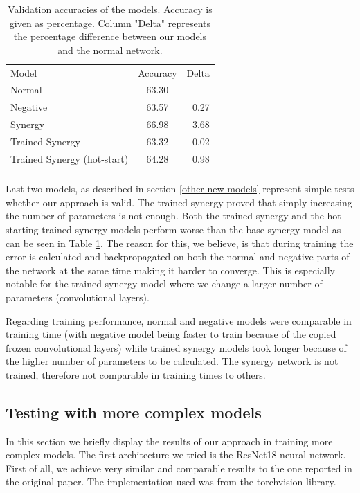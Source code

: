 \documentclass[b5paper]{book}
\let\cite\parencite
\begin{document}
\begin{table}
\centering
\caption{Validation accuracies of the models. Accuracy is given as percentage. Column "Delta" represents the percentage difference between our models and the normal network.}
\label{tab:6}
\begin{tabular}{lcr}
\hline\noalign{\smallskip}
Model & Accuracy & Delta\\
\noalign{\smallskip}\hline\noalign{\smallskip}
Normal & 63.30 & - \\
Negative & 63.57 & 0.27 \\
Synergy & 66.98 & 3.68 \\
Trained Synergy & 63.32 & 0.02 \\
Trained Synergy (hot-start) & 64.28 & 0.98 \\
\noalign{\smallskip}\hline
\end{tabular}
\end{table}

Last two models, as described in section \ref{other new models} represent simple tests whether our approach is valid. The trained synergy proved that simply increasing the number of parameters is not enough. Both the trained synergy and the hot starting trained synergy models perform worse than the base synergy model as can be seen in Table \ref{tab:6}. The reason for this, we believe, is that during training the error is calculated and backpropagated on both the normal and negative parts of the network at the same time making it harder to converge. This is especially notable for the trained synergy model where we change a larger number of parameters (convolutional layers). 

Regarding training performance, normal and negative models were comparable in training time (with negative model being faster to train because of the copied frozen convolutional layers) while trained synergy models took longer because of the higher number of parameters to be calculated. The synergy network is not trained, therefore not comparable in training times to others.

\subsection{Testing with more complex models}
\label{resnet}

In this section we briefly display the results of our approach in training more complex models. The first architecture we tried is the ResNet18 \cite{he2016deep} neural network. First of all, we achieve very similar and comparable results to the one reported in the original paper. The implementation used was from the torchvision \cite{torchvision} library.
\end{document}
